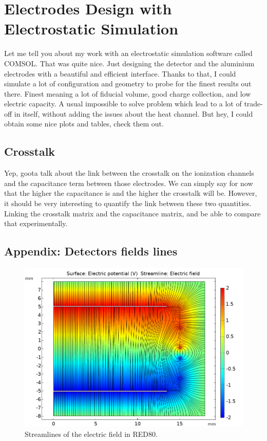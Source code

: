 
\chapter{Electrodes Design with Electrostatic Simulation} %

\label{ChapterElectrodes} %


Let me tell you about my work with an electrostatic simulation software called COMSOL.
That was quite nice. Just designing the detector and the aluminium electrodes with a beautiful and efficient interface.
Thanks to that, I could simulate a lot of configuration and geometry to probe for the finest results out there.
Finest meaning a lot of fiducial volume, good charge collection, and low electric capacity.
A usual impossible to solve problem which lead to a lot of trade-off in itself, without adding the issues about the heat channel.
But hey, I could obtain some nice plots and tables, check them out.


\section{Crosstalk}

Yep, goota talk about the link between the crosstalk on the ionization channels and the capacitance term between those electrodes.
We can simply say for now that the higher the capacitance is and the higher the crosstalk will be. However, it should be very interesting to quantify the link between these two quantities.
Linking the crosstalk matrix and the capacitance matrix, and be able to compare that experimentally.

\section{Appendix: Detectors fields lines}

\begin{figure}
\centering
\includegraphics[width=\linewidth]{Figures/Electrodes/streamlines_red80.png}
\caption{Streamlines of the electric field in RED80.}
\label{fig:streamlines-red80}
\end{figure}
